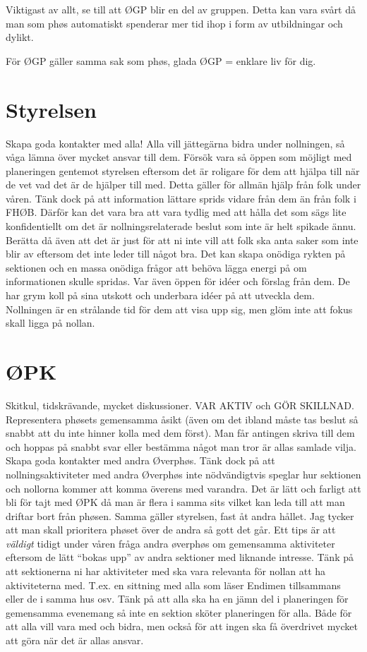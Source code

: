 \documentclass[10pt]{article}
\begin{document}
    Viktigast av allt, se till att ØGP blir en del av gruppen. Detta kan vara svårt då man som phøs automatiskt spenderar mer tid ihop i form av utbildningar och dylikt.

    För ØGP gäller samma sak som phøs, glada ØGP = enklare liv för dig.

    \section{Styrelsen}
    Skapa goda kontakter med alla! Alla vill jättegärna bidra under nollningen, så våga lämna över mycket ansvar till dem. Försök vara så öppen som möjligt med planeringen gentemot styrelsen eftersom det är roligare för dem att hjälpa till när de vet vad det är de hjälper till med. Detta gäller för allmän hjälp från folk under våren. Tänk dock på att information lättare sprids vidare från dem än från folk i FHØB. Därför kan det vara bra att vara tydlig med att hålla det som sägs lite konfidentiellt om det är nollningsrelaterade beslut som inte är helt spikade ännu. Berätta då även att det är just för att ni inte vill att folk ska anta saker som inte blir av eftersom det inte leder till något bra. Det kan skapa onödiga rykten på sektionen och en massa onödiga frågor att behöva lägga energi på om informationen skulle spridas. Var även öppen för idéer och förslag från dem. De har grym koll på sina utskott och underbara idéer på att utveckla dem. Nollningen är en strålande tid för dem att visa upp sig, men glöm inte att fokus skall ligga på nollan.

    \section{ØPK}
    Skitkul, tidskrävande, mycket diskussioner. VAR AKTIV och GÖR SKILLNAD. Representera phøsets gemensamma åsikt (även om det ibland måste tas beslut så snabbt att du inte hinner kolla med dem först). Man får antingen skriva till dem och hoppas på snabbt svar eller bestämma något man tror är allas samlade vilja. Skapa goda kontakter med andra Øverphøs. Tänk dock på att nollningsaktiviteter med andra Øverphøs inte nödvändigtvis speglar hur sektionen och nollorna kommer att komma överens med varandra. Det är lätt och farligt att bli för tajt med ØPK då man är flera i samma sits vilket kan leda till att man driftar bort från phøsen. Samma gäller styrelsen, fast åt andra hållet. Jag tycker att man skall prioritera phøset över de andra så gott det går. Ett tips är att \textit{väldigt} tidigt under våren fråga andra øverphøs om gemensamma aktiviteter eftersom de lätt ``bokas upp'' av andra sektioner med liknande intresse. Tänk på att sektionerna ni har aktiviteter med ska vara relevanta för nollan att ha aktiviteterna med. T.ex. en sittning med alla som läser Endimen tillsammans eller de i samma hus osv. Tänk på att alla ska ha en jämn del i planeringen för gemensamma evenemang så inte en sektion sköter planeringen för alla. Både för att alla vill vara med och bidra, men också för att ingen ska få överdrivet mycket att göra när det är allas ansvar.
\end{document}
